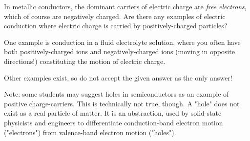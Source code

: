 

In metallic conductors, the dominant carriers of electric charge are {\it free electrons}, which of course are negatively charged.  Are there any examples of electric conduction where electric charge is carried by positively-charged particles?







One example is conduction in a fluid electrolyte solution, where you often have both positively-charged ions and negatively-charged ions (moving in opposite directions!) constituting the motion of electric charge.







Other examples exist, so do not accept the given answer as the only answer!

\vskip 10pt

Note: some students may suggest holes in semiconductors as an example of positive charge-carriers.  This is technically not true, though.  A "hole" does not exist as a real particle of matter.  It is an abstraction, used by solid-state physicists and engineers to differentiate conduction-band electron motion ("electrons") from valence-band electron motion ("holes").




